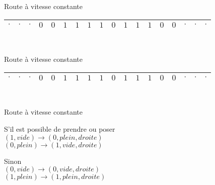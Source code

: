 \documentclass[12pt]{beamer}
\begin{document}
\begin{frame}{Route à vitesse constante}
\addtocounter{framenumber}{-1}
\begin{center}
    \begin{tabular}{|c|c|c|c|c|c|c|c|c|c|c|c|c|c|c|c|c|c|}\hline
     $\cdot$ & $\cdot$ & $\cdot$ & $0$ & $0$ & $1$ & $1$ & $1$ & $1$ & $0$ & $1$ & $1$ & $1$ & $0$ & $0$ & $\cdot$ & $\cdot$ & $\cdot$ \\\hline
     
\end{tabular}\\
\end{center}
\end{frame}

\begin{frame}{Route à vitesse constante}
\addtocounter{framenumber}{-1}
\begin{center}
    \begin{tabular}{|c|c|c|c|c|c|c|c|c|c|c|c|c|c|c|c|c|c|}\hline
     $\cdot$ & $\cdot$ & $\cdot$ & $0$ & $0$ & $1$ & $1$ & $1$ & $1$ & $0$ & $1$ & $1$ & $1$ & $0$ & $0$ & $\cdot$ & $\cdot$ & $\cdot$ \\\hline
     
\end{tabular}\\
\end{center}
\end{frame}

\begin{frame}{Route à vitesse constante}
\begin{center}
S'il est possible de prendre ou poser\\
$(1,vide) \longrightarrow (0, plein, droite)$\\
$(0,plein) \longrightarrow (1, vide, droite)$\\

\pause
\vspace{0.5cm}


Sinon\\
$(0,vide) \longrightarrow (0, vide, droite)$\\
$(1,plein) \longrightarrow (1, plein, droite)$\\
\end{center}
\end{frame}
\end{document}

